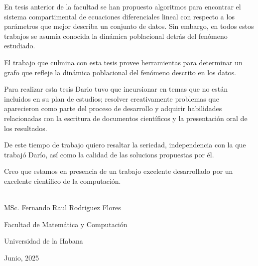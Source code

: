 \begin{opinion}

    En tesis anterior de la facultad se han propuesto algoritmos para encontrar el sistema compartimental de ecuaciones diferenciales lineal con respecto a los parámetros que mejor describa un conjunto de datos. Sin embargo, en todos estos trabajos se asumía conocida la dinámica poblacional detrás del fenómeno estudiado.

    El trabajo que culmina con esta tesis provee herramientas para determinar un grafo que refleje la dinámica poblacional del fenómeno descrito en los datos.
  
    Para realizar esta tesis Dario tuvo que incursionar en temas que no están incluidos en su plan de estudios; resolver creativamente problemas que aparecieron como parte del proceso de desarrollo  y  adquirir habilidades relacionadas con la escritura de documentos científicos y la presentación oral de los resultados.
  
    De este tiempo de trabajo quiero resaltar la seriedad, independencia con la que trabajó Darío, así como la calidad de las solucions propuestas por él.
  
     Creo que estamos en presencia de un trabajo excelente desarrollado por un excelente científico de la computación.
  
\begin{flushright}
    \underline{\hspace{6.5cm}}\\
    MSc. Fernando Raul Rodriguez Flores
 
    Facultad de Matemática y Computación
   
    Universidad de la Habana
 
    Junio, 2025
\end{flushright}

\end{opinion}
